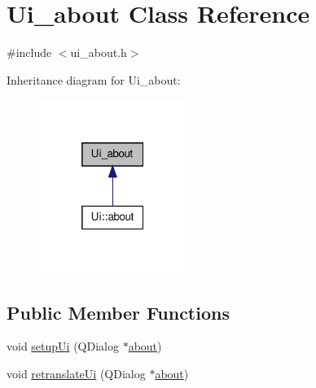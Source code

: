 \hypertarget{classUi__about}{
\section{Ui\_\-about Class Reference}
\label{classUi__about}
}


{\ttfamily \#include $<$ui\_\-about.h$>$}



Inheritance diagram for Ui\_\-about:
\nopagebreak
\begin{figure}[H]
\begin{center}
\leavevmode
\includegraphics[width=136pt]{classUi__about__inherit__graph}
\end{center}
\end{figure}
\subsection*{Public Member Functions}
\begin{DoxyCompactItemize}
\item 
void \hyperlink{classUi__about_ade605029c03d96bbda6ca78d9e982804}{setupUi} (QDialog $\ast$\hyperlink{classabout}{about})
\item 
void \hyperlink{classUi__about_aaba8586f919f4992e98e10f693f1e2dc}{retranslateUi} (QDialog $\ast$\hyperlink{classabout}{about})
\end{DoxyCompactItemize}
